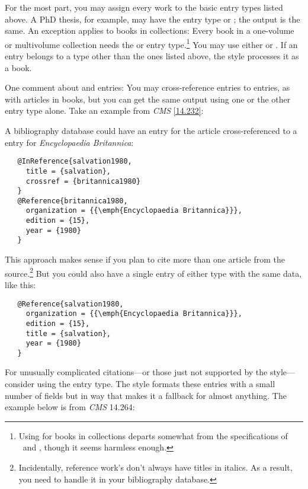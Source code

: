 \documentclass[11pt,letterpaper,oneside]{article}
\begin{document}
\noindent For the most part, you may assign every work to the basic
entry types listed above. A PhD thesis, for example, may have the
entry type  or ; the output is the
same. An exception applies to books in collections: Every book in a
one-volume or multivolume collection needs the  or
 entry type.\footnote{Using  for
books in collections departs somewhat from the specifications of
\BibTeX\ and \biblatex, though it seems harmless enough.} You may use
either  or . If an entry belongs
to a type other than the ones listed above, the style processes it as
a book.

One comment about  and 
entries: You may cross-reference  entries to
 entries, as with articles in books, but you can
get the same output using one or the other entry type alone. Take an
example from \textit{CMS} \ref{14.232}:

\begin{citeonly}
\item \cite{salvation1980}
\end{citeonly}

A bibliography database could have an  entry for
the article cross-referenced to a  entry for
\textit{Encyclopaedia Britannica}:

\begin{verbatim}
   @InReference{salvation1980,
     title = {salvation},
     crossref = {britannica1980}
   }
   @Reference{britannica1980,
     organization = {{\emph{Encyclopaedia Britannica}}},
     edition = {15},
     year = {1980}
   }
\end{verbatim}

\noindent This approach makes sense if you plan to cite more than one
article from the source.\footnote{Incidentally, reference work's don't
always have titles in italics. As a result, you need to handle it in
your bibliography database.} But you could also have a single entry of
either type with the same data, like this:

\begin{verbatim}
   @Reference{salvation1980,
     organization = {{\emph{Encyclopaedia Britannica}}},
     edition = {15},
     title = {salvation},
     year = {1980}
   }
\end{verbatim}

For unusually complicated ci\-ta\-tions---or those just not supported
by the style---consider using the  entry type. The style
formats these entries with a small number of fields but in way that
makes it a fallback for almost anything. The example below is from
\textit{CMS} 14.264:
\end{document}
